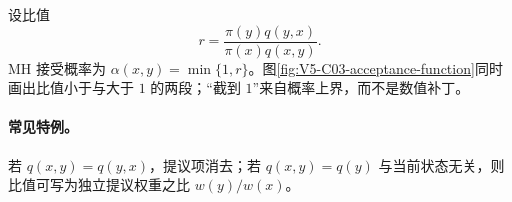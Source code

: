 \documentclass[UTF8,a4paper,11pt,openany]{ctexbook}
\begin{document}
\setcounter{page}{766}
\setcounter{chapter}{32}
\setcounter{figure}{5}
\pagestyle{headings}
设比值
\[
r=\frac{\pi(y)q(y,x)}{\pi(x)q(x,y)}.
\]
MH 接受概率为 $\alpha(x,y)=\min\{1,r\}$。图\ref{fig:V5-C03-acceptance-function}同时画出比值小于与大于 $1$ 的两段；“截到 $1$”来自概率上界，而不是数值补丁。

\paragraph{常见特例。}
若 $q(x,y)=q(y,x)$，提议项消去；若 $q(x,y)=q(y)$ 与当前状态无关，则比值可写为独立提议权重之比 $w(y)/w(x)$。
\end{document}
